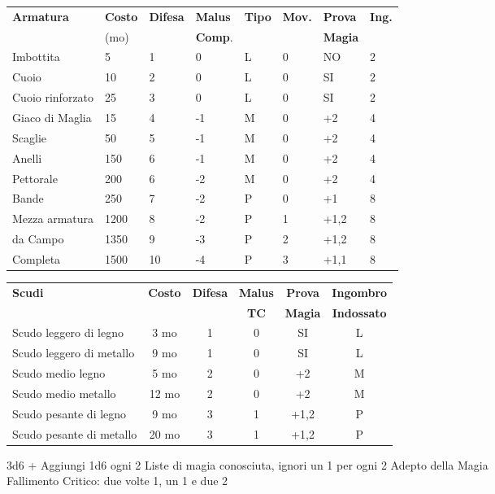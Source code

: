 \documentclass[landscape,10pt,a4paper]{article}
\begin{document}
\begin{multicols}{2}
\begin{dmbox}[title=Armature - pagina \pageref{equipaggiamentoarmature}]
\begin{tabular}{llllllll}
\textbf{Armatura} & \textbf{Costo} & \textbf{Difesa} & \textbf{Malus} &  \textbf{Tipo} & \textbf{Mov.} & \textbf{Prova}&\textbf{Ing.}\\
&(mo)&&\textbf{Comp}.&&&\textbf{Magia}&\\
\hline
Imbottita & 5  & 1 & 0 & L & 0 & NO&2\\
Cuoio & 10  & 2 & 0  & L & 0 & SI&2\\
Cuoio rinforzato& 25   & 3  & 0   & L & 0 & SI&2\\
Giaco di Maglia & 15  & 4  & -1  & M & 0 &+2&4\\
Scaglie& 50  & 5  & -1  & M & 0 &+2&4\\
Anelli & 150  & 6  & -1  & M & 0 &+2&4\\
Pettorale  & 200  & 6  & -2  & M & 0 &+2&4\\
Bande & 250  & 7  & -2  & P & 0 &+1&8\\
Mezza armatura  & 1200 & 8  & -2  & P & 1 &+1,2&8\\
da Campo& 1350 & 9  & -3  & P & 2 &+1,2&8\\
Completa& 1500 & 10 & -4  & P & 3 &+1,1&8\\
\end{tabular}
\end{dmbox}

\begin{dmbox}[title=Scudi - pagina \pageref{tabella-scudi}]
\begin{tabular}{lccccc}
\textbf{Scudi} & \textbf{Costo} & \textbf{Difesa} & \textbf{Malus} & \textbf{Prova} &  \textbf{Ingombro}\\
&&&\textbf{TC}&\textbf{Magia}&\textbf{Indossato}\\
\hline
Scudo leggero di legno  & 3 mo  &  1& 0& SI  & L\\
Scudo leggero di metallo & 9 mo  &  1& 0& SI  & L\\
Scudo medio legno &5 mo &  2& 0& +2& M\\
Scudo medio metallo  &12 mo  &  2  & 0& +2  & M\\
Scudo pesante di legno   & 9  mo  &  3 & 1& +1,2  & P\\
Scudo pesante di metallo & 20 mo  &  3& 1& +1,2  & P\\
\end{tabular}
\end{dmbox}

\begin{dmbox}[title=Prova di Magia - pagina \pageref{magieprovadimagia}]
3d6 + Aggiungi 1d6 ogni 2 Liste di magia conosciuta, ignori un 1 per ogni 2 Adepto della Magia\\
Fallimento Critico: due volte 1, un 1 e due 2
\end{dmbox}


\end{multicols}
\end{document}
